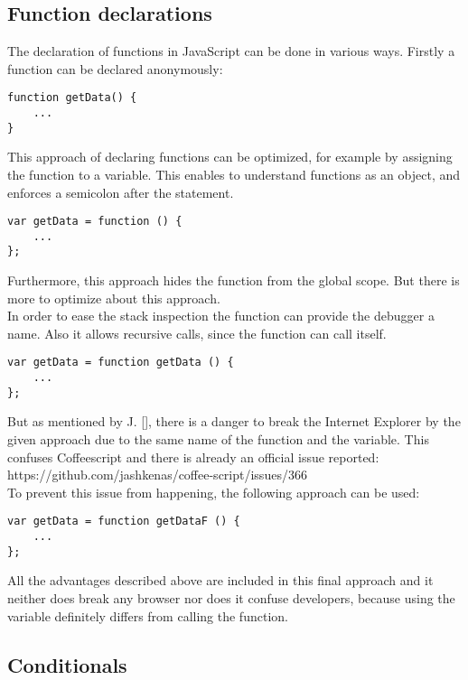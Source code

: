\documentclass{bioinfo}
\begin{document}
\begin{methods}
\subsection{Function declarations}
The declaration of functions in JavaScript can be done in various ways. Firstly a function can be declared anonymously:
\begin{lstlisting}
function getData() {
    ...
}
\end{lstlisting}
This approach of declaring functions can be optimized, for example by assigning the function to a variable. This enables to understand functions as an object, and enforces a semicolon after the statement. 
\begin{lstlisting}
var getData = function () {
    ...
};
\end{lstlisting}
Furthermore, this approach hides the function from the global scope.
But there is more to optimize about this approach.\\
In order to ease the stack inspection the function can provide the debugger a name. Also it allows recursive calls, since the function can call itself.
\begin{lstlisting}
var getData = function getData () {
    ...
};
\end{lstlisting}
But as mentioned by J. [\citealp{resig}], there is a danger to break the Internet Explorer by the given approach due to the same name of the function and the variable. This confuses Coffeescript and there is already an official issue reported: https://github.com/jashkenas/coffee-script/issues/366 \\
To prevent this issue from happening, the following approach can be used:
\begin{lstlisting}
var getData = function getDataF () {
    ...
};
\end{lstlisting}
All the advantages described above are included in this final approach and it neither does break any browser nor does it confuse developers, because using the variable definitely differs from calling the function.
\newpage
\subsection{Conditionals}


\end{methods}
\end{document}
